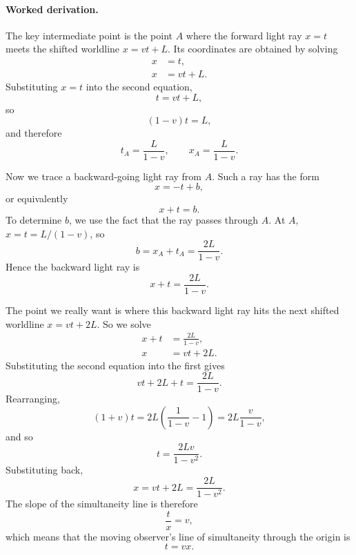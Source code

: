 \paragraph{Worked derivation.} The key intermediate point is the point \(A\) where the forward light ray \(x=t\) meets the shifted worldline \(x=vt+L\). Its coordinates are obtained by solving
\begin{align}
x &= t, \\
x &= vt+L.
\end{align}
Substituting \(x=t\) into the second equation,
\begin{equation}
t=vt+L,
\end{equation}
so
\begin{equation}
(1-v)t=L,
\end{equation}
and therefore
\begin{equation}
t_A=\frac{L}{1-v},\qquad x_A=\frac{L}{1-v}.
\end{equation}

Now we trace a backward-going light ray from \(A\). Such a ray has the form
\begin{equation}
x=-t+b,
\end{equation}
or equivalently
\begin{equation}
x+t=b.
\end{equation}
To determine \(b\), we use the fact that the ray passes through \(A\). At \(A\), \(x=t=L/(1-v)\), so
\begin{equation}
b=x_A+t_A=\frac{2L}{1-v}.
\end{equation}
Hence the backward light ray is
\begin{equation}
x+t=\frac{2L}{1-v}.
\end{equation}

The point we really want is where this backward light ray hits the next shifted worldline \(x=vt+2L\). So we solve
\begin{align}
x+t &= \frac{2L}{1-v}, \\
x &= vt+2L.
\end{align}
Substituting the second equation into the first gives
\begin{equation}
vt+2L+t=\frac{2L}{1-v}.
\end{equation}
Rearranging,
\begin{equation}
(1+v)t=2L\left(\frac{1}{1-v}-1\right)=2L\frac{v}{1-v},
\end{equation}
and so
\begin{equation}
t=\frac{2Lv}{1-v^2}.
\end{equation}
Substituting back,
\begin{equation}
x=vt+2L=\frac{2L}{1-v^2}.
\end{equation}
The slope of the simultaneity line is therefore
\begin{equation}
\frac{t}{x}=v,
\end{equation}
which means that the moving observer's line of simultaneity through the origin is
\begin{equation}
t=vx.
\end{equation}

